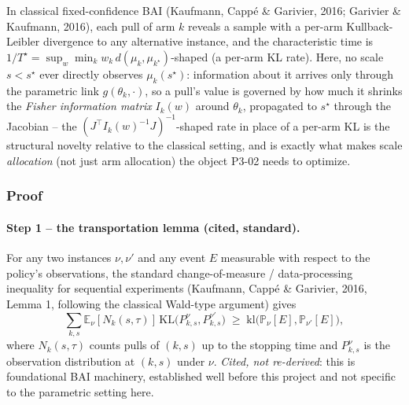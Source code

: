 \begin{remark}
\label{rem:not-classical-bai}
In classical fixed-confidence BAI (Kaufmann, Capp\'e \& Garivier, 2016; Garivier \&
Kaufmann, 2016), each pull of arm $k$ reveals a sample with a per-arm
Kullback-Leibler divergence to any alternative instance, and the characteristic time
is $1/T^\star = \sup_w \min_{k} w_k \, d(\mu_k, \mu_{k^\star})$-shaped (a per-arm KL
rate). Here, no scale $s < s^\star$ ever directly observes $\mu_k(s^\star)$: information
about it arrives only through the parametric link $g(\theta_k, \cdot)$, so a pull's value
is governed by how much it shrinks the \emph{Fisher information matrix} $I_k(w)$ around
$\theta_k$, propagated to $s^\star$ through the Jacobian -- the
$(J^\top I_k(w)^{-1} J)^{-1}$-shaped rate in place of a per-arm KL is the structural
novelty relative to the classical setting, and is exactly what makes scale
\emph{allocation} (not just arm allocation) the object P3-02 needs to optimize.
\end{remark}

\subsubsection{Proof}

\paragraph{Step 1 -- the transportation lemma (cited, standard).}
For any two instances $\nu, \nu'$ and any event $E$ measurable with respect to the
policy's observations, the standard change-of-measure / data-processing inequality for
sequential experiments (Kaufmann, Capp\'e \& Garivier, 2016, Lemma 1, following the
classical Wald-type argument) gives
\[
  \sum_{k,s} \mathbb{E}_\nu[N_k(s, \tau)] \, \mathrm{KL}\big(P_{k,s}^\nu, P_{k,s}^{\nu'}\big)
  \;\ge\; \mathrm{kl}\big(\mathbb{P}_\nu[E], \mathbb{P}_{\nu'}[E]\big),
\]
where $N_k(s,\tau)$ counts pulls of $(k,s)$ up to the stopping time and $P_{k,s}^\nu$ is
the observation distribution at $(k,s)$ under $\nu$. \emph{Cited, not re-derived}: this
is foundational BAI machinery, established well before this project and not specific to
the parametric setting here.

